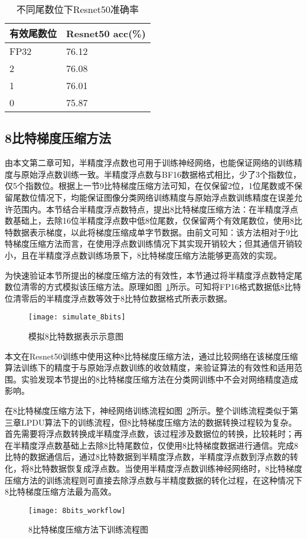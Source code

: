 \begin{table}[htb]
\centering
\noindent\begin{minipage}{0.6\textwidth}
\centering
\caption{不同尾数位下Resnet50准确率}
\label{tab:simulate_11_10_9bits_acc}
\begin{tabular}{p{2cm}p{2.5cm}}
\toprule[1.5pt]
有效尾数位 & Resnet50 acc(\%) \\\midrule[1pt]
FP32 & 76.12 \\
2 & 76.08 \\
1 & 76.01 \\
0 & 75.87 \\
\midrule[1pt]
\end{tabular}
\end{minipage}
\end{table}

\subsection{8比特梯度压缩方法}
由本文第二章可知，半精度浮点数也可用于训练神经网络，也能保证网络的训练精度与原始浮点数训练一致。半精度浮点数与BF16数据格式相比，少了3个指数位，仅5个指数位。根据上一节9比特梯度压缩方法可知，在仅保留2位，1位尾数或不保留尾数位情况下，均能保证图像分类网络训练精度与原始浮点数训练精度在误差允许范围内。本节结合半精度浮点数特点，提出8比特梯度压缩方法：在半精度浮点数基础上，去除16位半精度浮点数中低8位尾数，仅保留两个有效尾数位，使用8比特数据表示梯度，以此将梯度压缩成单字节数据。由前文可知：该方法相对于9比特梯度压缩方法而言，在使用浮点数训练情况下其实现开销较大；但其通信开销较小，且在半精度浮点数训练场景下，8比特梯度压缩方法能够更高效的实现。

为快速验证本节所提出的梯度压缩方法的有效性，本节通过将半精度浮点数特定尾数位清零的方式模拟该压缩方法。原理如图~\ref{fig:simulate_8bits}所示。可知将FP16格式数据低8比特位清零后的半精度浮点数等效于8比特位数据格式所表示数据。

\begin{figure}[htp]
\centering
\texttt{[image: simulate\_8bits]}
\caption{模拟8比特数据表示示意图}
\label{fig:simulate_8bits}
\end{figure}


本文在Resnet50训练中使用这种8比特梯度压缩方法，通过比较网络在该梯度压缩算法训练下的精度于与原始浮点数训练的收敛精度，来验证算法的有效性和适用范围。实验发现本节提出的8比特梯度压缩方法在分类网训练中不会对网络精度造成影响。

在8比特梯度压缩方法下，神经网络训练流程如图~\ref{fig:8bits_workflow}所示。整个训练流程类似于第三章LPDU算法下的训练流程，但8比特梯度压缩方法的数据转换过程较为复杂。首先需要将浮点数转换成半精度浮点数，该过程涉及数据位的转换，比较耗时；再在半精度浮点数基础上去除8比特尾数位，仅使用8比特梯度数据进行通信。完成8比特的数据通信后，通过8比特数据到半精度浮点数，半精度浮点数到浮点数的转化，将8比特数据恢复成浮点数。当使用半精度浮点数训练神经网络时，8比特梯度压缩方法的训练流程则可直接去除浮点数与半精度数据的转化过程，在这种情况下8比特梯度压缩方法最为高效。
\begin{figure}[htp]
\centering
\texttt{[image: 8bits\_workflow]}
\caption{8比特梯度压缩方法下训练流程图}
\label{fig:8bits_workflow}
\end{figure}

